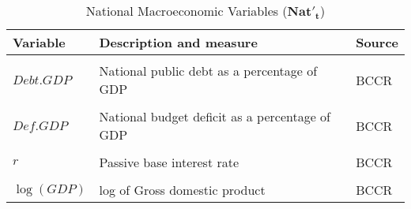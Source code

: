 \begin{table}[ht]
\caption{National Macroeconomic Variables ($\mathbf{Nat'_{t}}$)}
\centering
\begin{tabular}{l l l}
\hline\hline
Variable & Description and measure & Source \\ [0.5ex] 
\hline
\\
$Debt.GDP$ & National public debt as a percentage of GDP  & BCCR\\
\\
$Def.GDP$ & National budget deficit as a percentage of GDP  & BCCR\\
\\
$r$ & Passive base interest rate & BCCR\\
\\
$\log(GDP)$ & log of Gross domestic product & BCCR\\
[1ex]
\hline
\end{tabular}
\label{table:macro}
\end{table}


